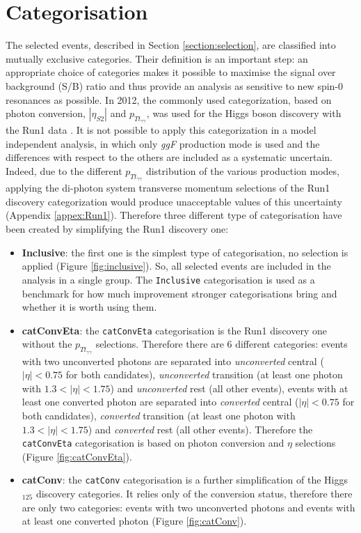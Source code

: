 \documentclass[a4paper, oneside, 11pt, openright]{book}
\begin{document}
 		\section{Categorisation}
 			The selected events, described in Section \ref{section:selection}, are classified into mutually exclusive categories. Their definition is an important step: an appropriate choice of categories makes it possible to maximise the signal over background (S/B) ratio and thus provide an analysis as sensitive to new spin-0 resonances as possible. In 2012, the commonly used categorization, based on photon conversion, $|\eta_{S2}|$ and $p_{Tt_{\gamma\gamma}}$, was used for the Higgs boson discovery with the Run1 data \cite{higgs_atlas}. It is not possible to apply this categorization in a model independent analysis, in which only \textit{ggF} production mode is used and the differences with respect to the others are included as a systematic uncertain. Indeed, due to the different $p_{Tt_{\gamma\gamma}}$ distribution of the various production modes, applying the di-photon system transverse momentum selections of the Run1 discovery categorization would produce unacceptable values of this uncertainty (Appendix \ref{appex:Run1}). Therefore three different type of categorisation have been created by simplifying the Run1 discovery one:
 			\begin{itemize}
 				\item \textbf{Inclusive}: the first one is the simplest type of categorisation, no selection is applied (Figure \ref{fig:inclusive}). So, all selected events are included in the analysis in a single group. The \texttt{Inclusive} categorisation is used as a benchmark for how much improvement stronger categorisations bring and whether it is worth using them. 
 				\item \textbf{catConvEta}: the \texttt{catConvEta} categorisation is the Run1 discovery one without the $p_{Tt_{\gamma\gamma}}$ selections. Therefore there are 6 different categories: events with two unconverted photons are separated into \textit{unconverted} central ($|\eta|<0.75$ for both candidates), \textit{unconverted} transition (at least one photon with $1.3<|\eta|<1.75$) and \textit{unconverted} rest (all other events), events with at least one converted photon are separated into \textit{converted} central ($|\eta|<0.75$ for both candidates), \textit{converted} transition (at least one photon with $1.3<|\eta|<1.75$) and \textit{converted} rest (all other events). Therefore the \texttt{catConvEta} categorisation is based on photon conversion and $\eta$ selections (Figure \ref{fig:catConvEta}).
 				\item \textbf{catConv}: the \texttt{catConv} categorisation is a further simplification of the Higgs$_{125}$ discovery categories. It relies only of the conversion status, therefore there are only two categories: events with two unconverted photons and events with at least one converted photon (Figure \ref{fig:catConv}).
 			\end{itemize}
\end{document}
